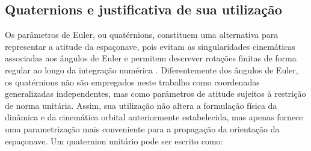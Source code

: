 






\subsection{Quaternions e justificativa de sua utilização}
\label{sec:representacao_quaternion}

Os parâmetros de Euler, ou quatérnions, constituem uma alternativa para representar a atitude da espaçonave, pois evitam as singularidades cinemáticas associadas aos ângulos de Euler e permitem descrever rotações finitas de forma regular ao longo da integração numérica \cite{wie2008space}.
Diferentemente dos ângulos de Euler, os quatérnions não são empregados neste trabalho como coordenadas generalizadas independentes, mas como parâmetros de atitude sujeitos à restrição de norma unitária. Assim, sua utilização não altera a formulação física da dinâmica e da cinemática orbital anteriormente estabelecida, mas apenas fornece uma parametrização mais conveniente para a propagação da orientação da espaçonave.
Um quaternion unitário pode ser escrito como:

